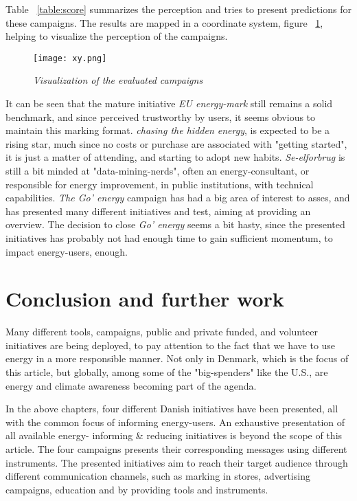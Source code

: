 \documentclass[journal]{IEEEtran}
\begin{document}
Table ~\ref{table:score} summarizes the perception and tries to present predictions for these campaigns. The results are mapped in a coordinate system, figure  ~\ref{fig:xy},  helping to visualize the perception of the campaigns.

\begin{figure}
\texttt{[image: xy.png]}
\caption{\textit{Visualization of the evaluated campaigns}}			
\label{fig:xy} %
\end{figure}


It can be seen that the mature initiative \textit{EU energy-mark} still remains a solid benchmark, and since perceived trustworthy by users, it seems obvious to maintain this marking format.
\textit{chasing the hidden energy}, is expected to be a rising star, much since no costs or purchase are associated with "getting started", it is just a matter of attending, and starting to adopt new habits.
\textit{Se-elforbrug} is still a bit minded at "data-mining-nerds", often an energy-consultant, or responsible for energy improvement, in public institutions, with technical capabilities.
\textit{The Go' energy} campaign has had a big area of interest to asses, and has presented many different initiatives and test, aiming at providing an overview. The decision to close \textit{Go' energy} seems a bit hasty, since the presented initiatives has probably not had enough time to gain sufficient momentum, to impact energy-users, enough.     

\section{Conclusion and further work}
Many different tools, campaigns, public and private funded, and volunteer initiatives are being deployed, to pay attention to the fact that we have to use energy in a more responsible manner. Not only in Denmark, which is the focus of this article, but globally,  among some of the "big-spenders" like the U.S., are energy and climate awareness becoming part of the agenda. \newline

In the above chapters, four different Danish initiatives have been presented, all with the common focus of informing energy-users. An exhaustive presentation of all available energy- informing \& reducing initiatives is beyond the scope of this article. The four campaigns presents their corresponding messages using different instruments. The presented initiatives aim to reach their target audience through different communication channels, such as marking in stores, advertising campaigns, education and by providing tools and instruments.
\end{document}
